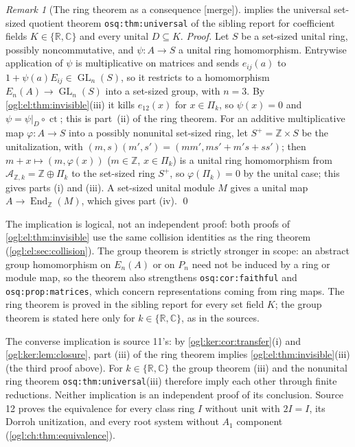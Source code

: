 \documentclass[11pt,oneside]{article}
\numberwithin{equation}{section}
\theoremstyle{definition}
\theoremstyle{remark}
\newtheorem{remark}[remark]{Remark}
\newcommand{\Z}{\mathbb Z}
\newcommand{\R}{\mathbb R}
\newcommand{\C}{\mathbb C}
\newcommand{\A}{\mathcal A}
\newcommand{\ct}{\operatorname{ct}}
\newcommand{\GL}{\operatorname{GL}}
\newcommand{\End}{\operatorname{End}}
\newcommand{\mergetag}{\textup{\textsf{\small[merge]}}}
\newcommand{\replabel}[1]{\nolinkurl{#1}}
\begin{document}
\begin{remark}[The ring theorem as a consequence \mergetag]\label{ogl:el:rem:ring}
 implies the universal set-sized quotient theorem
\replabel{osq:thm:universal} of the sibling report for coefficient fields
$K\in\{\R,\C\}$ and every unital $D\subseteq K$. \emph{Proof.} Let $S$ be a
set-sized unital ring, possibly noncommutative, and $\psi:A\to S$ a unital ring
homomorphism. Entrywise application of $\psi$ is multiplicative on matrices and
sends $e_{ij}(a)$ to $1+\psi(a)E_{ij}\in\GL_n(S)$, so it restricts to a
homomorphism $E_n(A)\to\GL_n(S)$ into a set-sized group, with $n=3$. By
\cref{ogl:el:thm:invisible}(iii) it kills $e_{12}(x)$ for $x\in\Pi_k$, so
$\psi(x)=0$ and $\psi=\psi|_D\circ\ct$; this is part~(ii) of the ring theorem.
For an additive multiplicative map $\varphi:A\to S$ into a possibly nonunital
set-sized ring, let $S^+=\Z\times S$ be the unitalization, with
$(m,s)(m',s')=(mm',ms'+m's+ss')$; then $m+x\mapsto(m,\varphi(x))$ ($m\in\Z$,
$x\in\Pi_k$) is a unital ring homomorphism from $\A_{\Z,k}=\Z\oplus\Pi_k$ to the
set-sized ring $S^+$, so $\varphi(\Pi_k)=0$ by the unital case; this gives parts
(i) and (iii). A set-sized unital module $M$ gives a unital map
$A\to\End_\Z(M)$, which gives part (iv). \qed

The implication is logical, not an independent proof: both proofs of
\cref{ogl:el:thm:invisible} use the same collision identities as the ring
theorem (\cref{ogl:el:sec:collision}). The group theorem is strictly stronger
in scope: an abstract group homomorphism on $E_n(A)$ or on $P_n$ need not be
induced by a ring or module map, so the theorem also strengthens
\replabel{osq:cor:faithful} and \replabel{osq:prop:matrices}, which concern
representations coming from ring maps. The ring theorem is proved in the
sibling report for every set field $K$; the group theorem is stated here only
for $k\in\{\R,\C\}$, as in the sources.

The converse implication is source 11's: by \cref{ogl:ker:cor:transfer}(i)
and \cref{ogl:ker:lem:closure}, part (iii) of the ring theorem implies
\cref{ogl:el:thm:invisible}(iii) (the third proof above). For
$k\in\{\R,\C\}$ the group theorem (iii) and the nonunital ring theorem
\replabel{osq:thm:universal}(iii) therefore imply each other through finite
reductions. Neither implication is an independent proof of its conclusion.
Source 12 proves the equivalence for every class ring $I$ without unit with
$2I=I$, its Dorroh unitization, and every root system without $A_1$ component
(\cref{ogl:ch:thm:equivalence}).
\end{remark}
\end{document}
